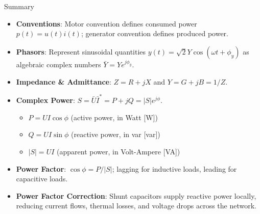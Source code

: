 \begin{frame}{Summary}
  \begin{itemize}
    \item \textbf{Conventions}: Motor convention defines consumed power $p(t) = u(t) i(t)$; generator convention defines produced power.
    \item \textbf{Phasors}: Represent sinusoidal quantities $y(t) = \sqrt{2}Y\cos(\omega t + \phi_y)$ as algebraic complex numbers $\bar{Y} = Y e^{j\phi_y}$.
    \item \textbf{Impedance \& Admittance}: $Z = R + jX$ and $Y = G + jB = 1/Z$.
    \item \textbf{Complex Power}: $S = \bar{U}\bar{I}^* = P + jQ = |S|e^{j\phi}$.
      \begin{itemize}
        \item $P = UI\cos\phi$ (active power, in Watt [W])
        \item $Q = UI\sin\phi$ (reactive power, in var [var])
        \item $|S| = UI$ (apparent power, in Volt-Ampere [VA])
      \end{itemize}
    \item \textbf{Power Factor}: $\cos\phi = P/|S|$; lagging for inductive loads, leading for capacitive loads.
    \item \textbf{Power Factor Correction}: Shunt capacitors supply reactive power locally, reducing current flows, thermal losses, and voltage drops across the network.
  \end{itemize}
\end{frame}
